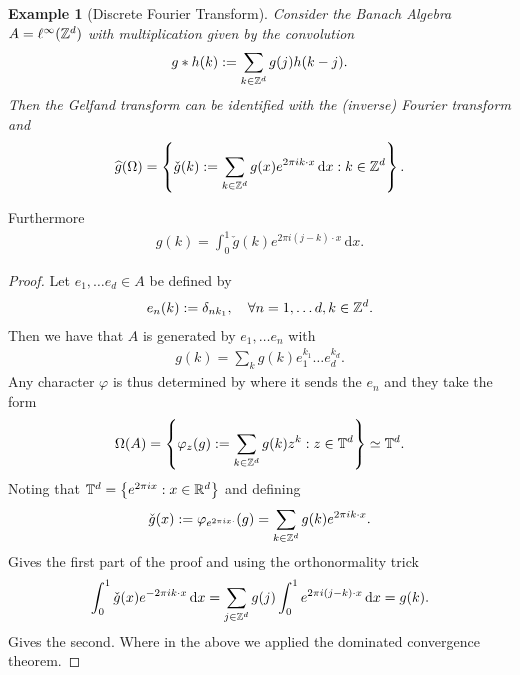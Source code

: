 \documentclass[12pt]{article}
\newtheorem{example}{Example}
\renewcommand{\d}{\,\mathrm{d}}
\begin{document}
\begin{CJK*}{UTF8}{gbsn}
	\begin{example}[Discrete Fourier Transform]
		Consider the Banach Algebra $A=\ell ^\infty(\mathbb{Z}^d)$ with multiplication given by the convolution
		\begin{align*}
			g* h(k):= \sum_{k \in \mathbb{Z}^d}g(j)h(k-j) .
		\end{align*}
		Then the Gelfand transform can be identified with the (inverse) Fourier transform and	\begin{align*}
			\wh{g}(\Omega)= \left\{ \check{g}(k):= \sum_{k \in \Z^d} g(x)e^{2\pi i k \cdot  x} \d x: k\in \Z^d\right\} .
		\end{align*}
	\end{example}
	Furthermore
	\begin{align*}
		g(k)=\int_{0}^1 \check{g}(k)e^{2 \pi i (j-k) \cdot x}\d x.
	\end{align*}
	\begin{proof}
		Let $e_1,\ldots e_d \in A$  be defined by
		\begin{align*}
			e_n(k):= \delta _{nk_1}, \quad\forall n=1,\ldots d, k\in \mathbb{Z}^d .
		\end{align*}
		Then we have that $A$ is generated by  $e_{1},\ldots e_n$ with
		\begin{align*}
			g(k) =\sum_{k} g(k) e_1^{k_1}\ldots e_d ^{k_d} .
		\end{align*}
		Any character $\varphi$ is thus determined by where it sends the $e_n$ and they take the form
		\begin{align*}
			\Omega(A)= \left\{ \varphi_z (g):= \sum_{k \in \mathbb{Z}^d} g(k) z^k: z \in \mathbb{T}^d  \right\} \simeq \mathbb{T}^d .
		\end{align*}
		Noting that $\mathbb{T}^d= \left\{ e^{ 2\pi i x}: x \in \mathbb{R}^d \right\} $ and defining
		\begin{align*}
			\check{g}(x):= \varphi_{e^{ 2\pi i x \cdot  }}(g)=\sum_{k \in \mathbb{Z}^d} g(k) e^{2 \pi  i k \cdot x}.
		\end{align*}
		Gives the first part of the proof and using the orthonormality trick
		\begin{align*}
			\int_{0}^1 \check{g}(x) e^{-2 \pi i k \cdot x}\d x=\sum_{j \in \Z^d} g(j)  \int_{0}^1 e^{2 \pi i (j-k) \cdot x}\d x= g(k).
		\end{align*}
		Gives the second. Where in the above we applied the dominated convergence theorem.
	\end{proof}




\end{CJK*}




\end{document}
